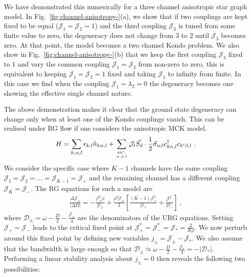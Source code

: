 \documentclass[reprint,prb,superscriptaddress]{revtex4-2}
\begin{document}
We have demonstrated this numerically for a three channel anisotropic star graph model.
In Fig.~\ref{fig:channel-anisotropy-}(a), we show that if two couplings are kept fixed to be equal (${\mathcal{J}}_1={\mathcal{J}}_2=1$) and the third coupling ${\mathcal{J}}_3$ is tuned from some finite value to zero, the degeneracy does not change from 3 to 2 until \(\mathcal{J}_3\) becomes zero.
At that point, the model becomes a two channel Kondo problem.
{\color{red}We also show in Fig.~\ref{fig:channel-anisotropy-}(b) that we keep the first coupling ${\mathcal{J}}_3$ fixed to $1$ and vary the common coupling ${\mathcal{J}}_1={\mathcal{J}}_2$ from non-zero to zero, this is equivalent to keeping ${\mathcal{J}}_1={\mathcal{J}}_2=1$ fixed and taking ${\mathcal{J}}_1$ to infinity from finite.
In this case we find when the coupling ${\mathcal{J}}_1=\lambda_2=0$ the degeneracy becomes one showing the effective single channel nature.
}

The above demonstration makes it clear that the ground state degeneracy can change only when at least one of the Kondo couplings vanish. This can be realised under RG flow if one considers the anisotropic MCK model.
\begin{align}
	H = \sum_{k,\alpha,l}\epsilon_{k,l} \hat n_{k\alpha,l} + \sum_{kk^\prime,\atop{\alpha,\beta,l}}{\mathcal{J}}_l \vec{S_d}\cdot\frac{1}{2}\vec{\sigma}_{\alpha\beta}c_{k\alpha,l}^\dagger c_{k^\prime\beta, l}~.
\end{align}
We consider the specific case where \(K-1\) channels have the same coupling \({\mathcal{J}}_1 = {\mathcal{J}}_2 = ... = {\mathcal{J}}_{K-1} = {\mathcal{J}}_+\) and the remaining channel has a different coupling \({\mathcal{J}}_K = {\mathcal{J}}_-\). The RG equations for such a model are
\begin{align}
	\frac{\Delta {\mathcal{J}}_\pm}{|\Delta D|} = -\frac{{\mathcal{J}}_\pm^2 \rho}{\mathcal{D}_\pm} + \frac{\rho^2 {\mathcal{J}}_\pm}{2}\left[\frac{(K-1){\mathcal{J}}_+^2}{\mathcal{D}_+} + \frac{{\mathcal{J}}_-^2}{\mathcal{D}_-}\right]~,
\end{align}
where \(\mathcal{D}_\pm = \omega - \frac{D}{2} - \frac{{\mathcal{J}}_\pm}{4}\) are the denominators of the URG equations.
Setting \({\mathcal{J}}_+ = {\mathcal{J}}_-\) leads to the critical fixed point at \({\mathcal{J}}_+^* = {\mathcal{J}}_-^* = {\mathcal{J}}_* = \frac{2}{K \rho}\). We now perturb around this fixed point by defining new variables \(j_\pm = {\mathcal{J}}_\pm - {\mathcal{J}}_*\). We also assume that the bandwidth is large enough so that \(\mathcal{D}_\pm \simeq \omega - \frac{D}{2} - \frac{{\mathcal{J}}_*}{4} = -|\mathcal{D}_*|\). Performing a linear stability analysis about \(j_\pm=0\) then reveals the following two possibilities:
\end{document}
